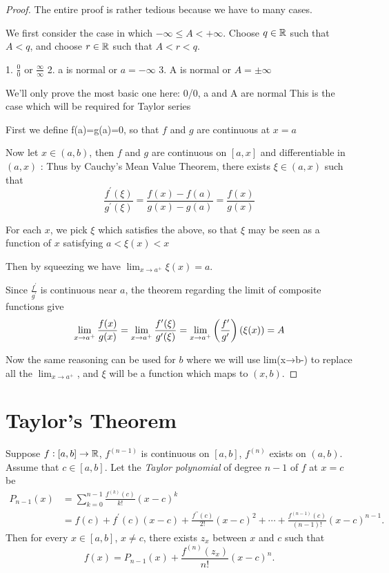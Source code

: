 \begin{proof}
The entire proof is rather tedious because we have to many cases.

We first consider the case in which $-\infty\le A<+\infty$. Choose $q\in\mathbb R$ such that $A<q$, and choose $r\in\mathbb R$ such that $A<r<q$.

1. $\frac{0}{0}$ or $\frac{\infty}{\infty}$
2. a is normal or $a=-\infty$
3. A is normal or $A=\pm\infty$



We'll only prove the most basic one here:
0/0, a and A are normal
This is the case which will be required for Taylor series

First we define f(a)=g(a)=0, so that $f$ and $g$ are continuous at $x=a$

Now let $x\in(a,b)$, then $f$ and $g$ are continuous on $[a,x]$ and differentiable in $(a,x)$
:
Thus by Cauchy's Mean Value Theorem, there exists $\xi\in(a,x)$ such that
\[ \frac{f^\prime(\xi)}{g^\prime(\xi)}=\frac{f(x)-f(a)}{g(x)-g(a)}=\frac{f(x)}{g(x)} \]

For each $x$, we pick $\xi$ which satisfies the above, so that $\xi$ may be seen as a function of $x$ satisfying $a<\xi(x)<x$

Then by squeezing we have $\lim_{x\to a^+}\xi(x)=a$.

Since $\frac{f^\prime}{g^\prime}$ is continuous near $a$, the theorem regarding the limit of composite functions give
\[ \lim_{x\to a^+}\frac{f(x)}{g(x)} = \lim_{x\to a^+}\frac{f'(\xi)}{g'(\xi)} = \lim_{x\to a^+}\left(\frac{f^\prime}{g^\prime}\right)(\xi(x)) = A \]

Now the same reasoning can be used for $b$ where we will use lim(x→b-) to replace all the $\lim_{x\to a^+}$, and $\xi$ will be a function which maps to $(x,b)$.
\end{proof}

\section{Taylor's Theorem}
\begin{theorem}
Suppose $f:[a,b]\to\mathbb R$, $f^{(n-1)}$ is continuous on $[a,b]$, $f^{(n)}$ exists on $(a,b)$. Assume that $c\in[a,b]$. Let the \emph{Taylor polynomial} of degree $n-1$ of $f$ at $x=c$ be
\begin{align*}
P_{n-1}(x)&=\sum_{k=0}^{n-1}\frac{f^{(k)}(c)}{k!}(x-c)^k\\
&=f(c)+f^\prime(c)(x-c)+\frac{f^{\prime\prime}(c)}{2!}(x-c)^2+\cdots+\frac{f^{(n-1)}(c)}{(n-1)!}(x-c)^{n-1}.
\end{align*}
Then for every $x\in[a,b]$, $x\neq c$, there exists $z_x$ between $x$ and $c$ such that
\begin{equation}\label{eqn:taylor-thrm}
f(x)=P_{n-1}(x)+\frac{f^{(n)}(z_x)}{n!}(x-c)^n.
\end{equation}
\end{theorem}

